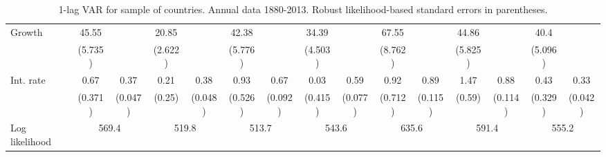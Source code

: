 \begin{table}[htbp]
\begin{tabular}{@{\extracolsep{4pt}}lcccccccccccccc@{}}
\quad Growth 	 &45.55 	 &  	 & 20.85 	 &  	 & 42.38 	 &  	 & 34.39 	 &  	 & 67.55 	 &  	 & 44.86 	 &  	 & 40.4 	 & 	 \\ 
 		 & (5.735) 	 &  	 & (2.622) 	 &  	 & (5.776) 	 &  	 & (4.503) 	 &  	 & (8.762) 	 &  	 & (5.825) 	 &  	 & (5.096) 	 &  	 \\ 
\quad Int. rate 	 &0.67 	 & 0.37 	 & 0.21 	 & 0.38 	 & 0.93 	 & 0.67 	 & 0.03 	 & 0.59 	 & 0.92 	 & 0.89 	 & 1.47 	 & 0.88 	 & 0.43 	 & 0.33	 \\ 
 		 & (0.371) 	 & (0.047) 	 & (0.25) 	 & (0.048) 	 & (0.526) 	 & (0.092) 	 & (0.415) 	 & (0.077) 	 & (0.712) 	 & (0.115) 	 & (0.59) 	 & (0.114) 	 & (0.329) 	 & (0.042) 	 \\ 
 \hline \rule{0pt}{4ex} 
  Log likelihood 	 &\multicolumn{2}{c}{569.4} 	 & \multicolumn{2}{c}{519.8} 	 & \multicolumn{2}{c}{513.7} 	 & \multicolumn{2}{c}{543.6} 	 & \multicolumn{2}{c}{635.6} 	 & \multicolumn{2}{c}{591.4} 	 & \multicolumn{2}{c}{555.2}\\ 

 \hline 	\end{tabular}		\caption{1-lag VAR for sample of countries. Annual data 1880-2013. Robust likelihood-based standard errors in parentheses.}
		\label{tab:all_1lag}

\end{table}